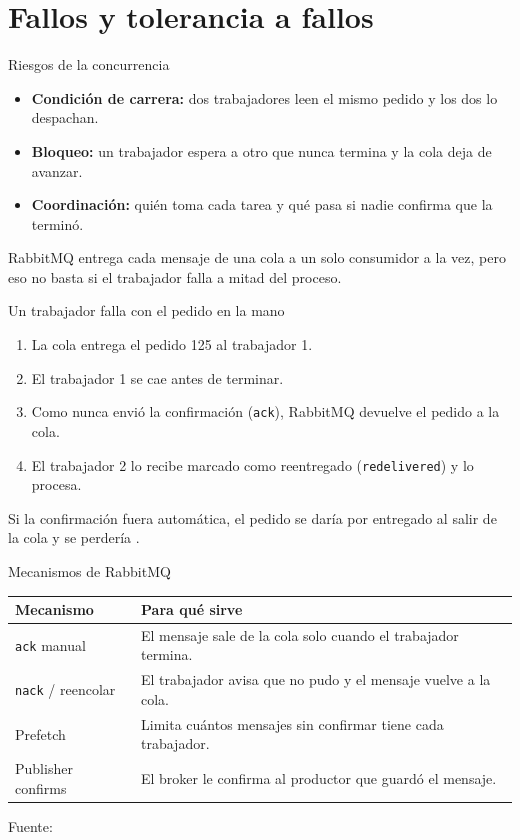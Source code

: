 \section{Fallos y tolerancia a fallos}

\begin{frame}{Riesgos de la concurrencia}
  \begin{itemize}
    \item \textbf{Condición de carrera:} dos trabajadores leen el mismo pedido y los dos lo despachan.
    \item \textbf{Bloqueo:} un trabajador espera a otro que nunca termina y la cola deja de avanzar.
    \item \textbf{Coordinación:} quién toma cada tarea y qué pasa si nadie confirma que la terminó.
  \end{itemize}
  \vspace{0.4cm}
  RabbitMQ entrega cada mensaje de una cola a un solo consumidor a la vez, pero eso no basta si el trabajador falla a mitad del proceso.
\end{frame}

\begin{frame}{Un trabajador falla con el pedido en la mano}
  \begin{enumerate}
    \item La cola entrega el pedido 125 al trabajador 1.
    \item El trabajador 1 se cae antes de terminar.
    \item Como nunca envió la confirmación (\texttt{ack}), RabbitMQ devuelve el pedido a la cola.
    \item El trabajador 2 lo recibe marcado como reentregado (\texttt{redelivered}) y lo procesa.
  \end{enumerate}
  \vspace{0.3cm}
  Si la confirmación fuera automática, el pedido se daría por entregado al salir de la cola y se perdería \cite{rabbitmq2026confirms}.
\end{frame}

\begin{frame}{Mecanismos de RabbitMQ}
  \begin{tabularx}{\textwidth}{lX}
    \toprule
    Mecanismo & Para qué sirve \\
    \midrule
    \texttt{ack} manual & El mensaje sale de la cola solo cuando el trabajador termina. \\
    \texttt{nack} / reencolar & El trabajador avisa que no pudo y el mensaje vuelve a la cola. \\
    Prefetch & Limita cuántos mensajes sin confirmar tiene cada trabajador. \\
    Publisher confirms & El broker le confirma al productor que guardó el mensaje. \\
    \bottomrule
  \end{tabularx}
  \vspace{0.3cm}
  {\small Fuente: \cite{rabbitmq2026confirms}}
\end{frame}

